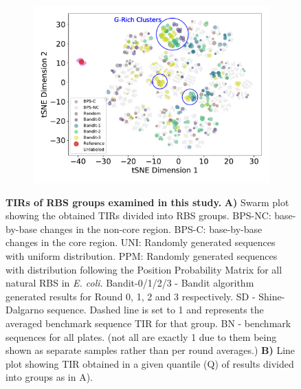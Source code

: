 \documentclass{article}
\begin{document}
\begin{figure}[!ht]
\begin{subfigure}[b]{0.48\textwidth}
    \end{subfigure}
    \begin{subfigure}[b]{0.48\textwidth}
        \centering
        \caption{}
        \includegraphics[scale=0.42]{plots/Main_Paper/tsneplot.pdf}
    \end{subfigure}
    \caption{
    \textbf{TIRs of RBS groups examined in this study.}
    \textbf{A)} Swarm plot showing the obtained TIRs divided into RBS groups.
    BPS-NC: base-by-base changes in the non-core region. 
    BPS-C: base-by-base changes in the core region. 
    UNI: Randomly generated sequences with uniform distribution. 
    PPM: Randomly generated sequences with distribution following the Position Probability Matrix for all natural RBS in \emph{E. coli}. 
    Bandit-0/1/2/3 - Bandit algorithm generated results for Round 0, 1, 2 and 3 respectively.
    SD - Shine-Dalgarno sequence.
    Dashed line is set to 1 and represents the averaged benchmark sequence TIR for that group. 
    BN - benchmark sequences for all plates. 
    (not all are exactly 1 due to them being shown as separate samples rather than per round averages.)
    \textbf{B)} Line plot showing TIR obtained in a given quantile (Q) of results divided into groups as in A).
}
\end{figure}
\end{document}
